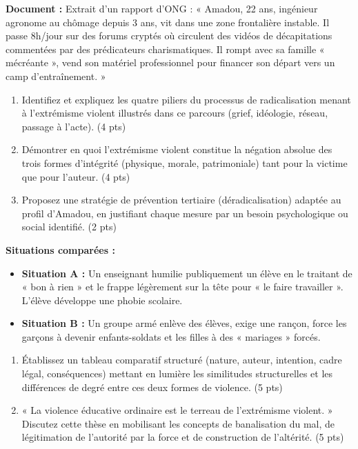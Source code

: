 \documentclass[11pt]{article}
\begin{document}
\begin{exercice}
\textbf{Document :} Extrait d'un rapport d'ONG : « Amadou, 22 ans, ingénieur agronome au chômage depuis 3 ans, vit dans une zone frontalière instable. Il passe 8h/jour sur des forums cryptés où circulent des vidéos de décapitations commentées par des prédicateurs charismatiques. Il rompt avec sa famille « mécréante », vend son matériel professionnel pour financer son départ vers un camp d'entraînement. »
\begin{enumerate}
    \item Identifiez et expliquez les quatre piliers du processus de radicalisation menant à l'extrémisme violent illustrés dans ce parcours (grief, idéologie, réseau, passage à l'acte). (4 pts)
    \item Démontrer en quoi l'extrémisme violent constitue la négation absolue des trois formes d'intégrité (physique, morale, patrimoniale) tant pour la victime que pour l'auteur. (4 pts)
    \item Proposez une stratégie de prévention tertiaire (déradicalisation) adaptée au profil d'Amadou, en justifiant chaque mesure par un besoin psychologique ou social identifié. (2 pts)
\end{enumerate}
\end{exercice}

\begin{exercice}
\textbf{Situations comparées :}
\begin{itemize}
    \item \textbf{Situation A :} Un enseignant humilie publiquement un élève en le traitant de « bon à rien » et le frappe légèrement sur la tête pour « le faire travailler ». L'élève développe une phobie scolaire.
    \item \textbf{Situation B :} Un groupe armé enlève des élèves, exige une rançon, force les garçons à devenir enfants-soldats et les filles à des « mariages » forcés.
\end{itemize}
\begin{enumerate}
    \item Établissez un tableau comparatif structuré (nature, auteur, intention, cadre légal, conséquences) mettant en lumière les similitudes structurelles et les différences de degré entre ces deux formes de violence. (5 pts)
    \item « La violence éducative ordinaire est le terreau de l'extrémisme violent. » Discutez cette thèse en mobilisant les concepts de banalisation du mal, de légitimation de l'autorité par la force et de construction de l'altérité. (5 pts)
\end{enumerate}
\end{exercice}
\end{document}
